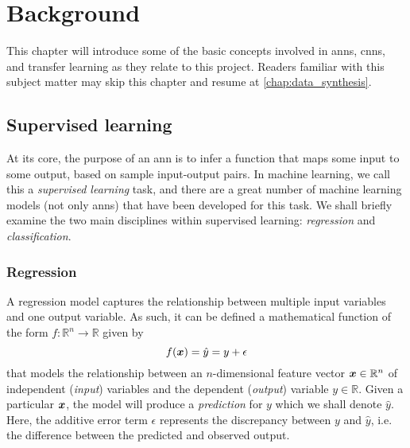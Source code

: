 \documentclass[../report.tex]{subfiles}
\begin{document}
\chapter{Background}
This chapter will introduce some of the basic concepts involved in \glspl{ann}, \glspl{cnn}, and transfer learning as they relate to this project.
Readers familiar with this subject matter may skip this chapter and resume at \cref{chap:data_synthesis}.

\section{Supervised learning}
At its core, the purpose of an \gls{ann} is to infer a function that maps some input to some output, based on sample input-output pairs.
In machine learning, we call this a \emph{supervised learning} task, and there are a great number of machine learning models (not only \glspl{ann}) that have been developed for this task.
We shall briefly examine the two main disciplines within supervised learning: \emph{regression} and \emph{classification}.

\subsection{Regression}
\label{sec:regression}
A regression model captures the relationship between multiple input variables and one output variable. 
As such, it can be defined a mathematical function of the form $f:\mathbb{R}^n\rightarrow \mathbb{R}$ given by
\begin{equation}
    \label{eq:reg_model}
    f({\bm{x}}) = \hat{y} = y + \epsilon
\end{equation}
that models the relationship between an $n$-dimensional feature vector ${\bm{x}} \in \mathbb{R}^n$ of independent (\emph{input}) variables and the dependent (\emph{output}) variable $y \in \mathbb{R}$. 
Given a particular ${\bm{x}}$, the model will produce a \emph{prediction} for $y$ which we shall denote $\hat{y}$.
Here, the additive error term $\epsilon$ represents the discrepancy between $y$ and $\hat{y}$, i.e. the difference between the predicted and observed output.
\end{document}
